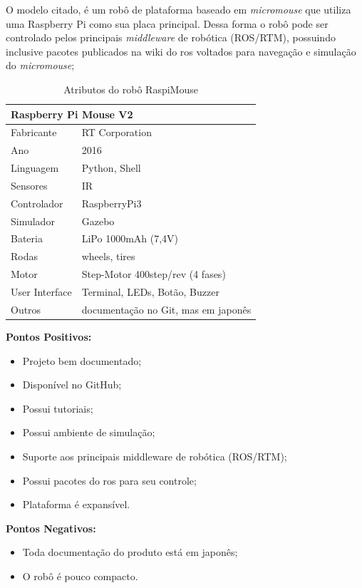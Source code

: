 O modelo citado, é um robô de plataforma baseado em \textit{micromouse} que utiliza uma Raspberry Pi como sua placa principal. Dessa forma o robô pode ser controlado pelos principais \textit{middleware} de robótica (ROS/RTM), possuindo inclusive pacotes publicados na wiki do \gls*{ros} voltados para navegação e simulação do \textit{micromouse};

\begin{table}[]
	\centering
	\caption{Atributos do robô RaspiMouse}
	\begin{tabular}{|l|l|}
		\hline
		\multicolumn{2}{|l|}{\textbf{Raspberry Pi Mouse V2}} \\ \hline
		Fabricante & RT Corporation \\ \hline
		Ano & 2016 \\ \hline
		Linguagem & Python, Shell \\ \hline
		Sensores & IR \\ \hline
		Controlador & RaspberryPi3 \\ \hline
		Simulador & Gazebo \\ \hline
		Bateria & LiPo 1000mAh (7,4V) \\ \hline
		Rodas & wheels, tires \\ \hline
		Motor & Step-Motor 400step/rev (4 fases) \\ \hline
		User Interface & Terminal, LEDs, Botão, Buzzer \\ \hline
		Outros & documentação no Git, mas em japonês \\ \hline
	\end{tabular}
	\label{tab:RaspiMouse}
\end{table}

\textbf{Pontos Positivos:}
\begin{itemize}
	\item Projeto bem documentado;
	\item Disponível no GitHub;
	\item Possui tutoriais;
	\item Possui ambiente de simulação;
	\item Suporte aos principais middleware de robótica (ROS/RTM);
	\item Possui pacotes do \gls*{ros} para seu controle;
	\item Plataforma é expansível.
\end{itemize}

\textbf{Pontos Negativos:}
\begin{itemize}
	\item Toda documentação do produto está em japonês;
	\item O robô é pouco compacto.
\end{itemize}

